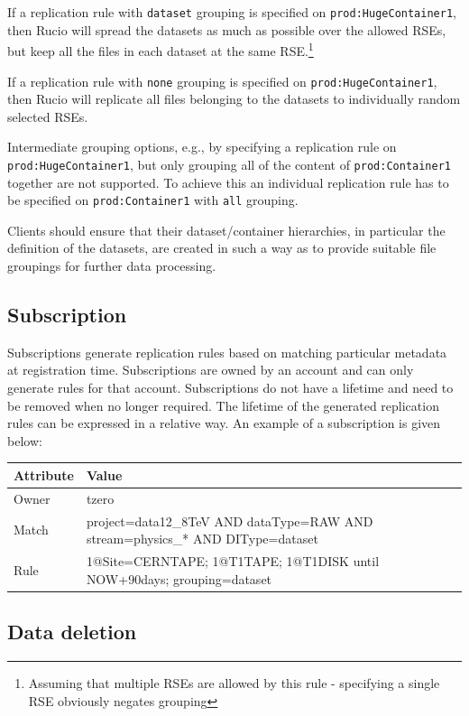 \documentclass{atlasnote}
\begin{document}
If a replication rule with \texttt{dataset} grouping is specified on \texttt{prod:HugeContainer1}, then Rucio will spread the datasets as much as possible over the allowed RSEs, but keep all the files in each dataset at the same RSE.\footnote{Assuming that multiple RSEs are allowed by this rule - specifying a single RSE obviously negates grouping}

If a replication rule with \texttt{none} grouping is specified on \texttt{prod:HugeContainer1}, then Rucio will replicate all files belonging to the datasets to individually random selected RSEs.

Intermediate grouping options, e.g., by specifying a replication rule on \texttt{prod:HugeContainer1}, but only grouping all of the content of \texttt{prod:Container1} together are not supported. To achieve this an individual replication rule has to be specified on \texttt{prod:Container1} with \texttt{all} grouping.

Clients should ensure that their dataset/container hierarchies, in particular the definition of the datasets, are created in such a way as to provide suitable file groupings for further data processing.

\subsection{Subscription}
\label{sec:Subscription}

Subscriptions generate replication rules based on matching particular metadata at registration time. Subscriptions are owned by an account and can only generate rules for that account. Subscriptions do not have a lifetime and need to be removed when no longer required. The lifetime of the generated replication rules can be expressed in a relative way. An example of a subscription is given below:

\bigskip

\begin{tabular}{l p{11cm}}
\toprule
\textbf{Attribute} & \textbf{Value} \\
\midrule
Owner & tzero \\
Match & project=data12\_8TeV AND dataType=RAW AND stream=physics\_* AND DIType=dataset \\
Rule & 1@Site=CERNTAPE; 1@T1TAPE; 1@T1DISK until NOW+90days; grouping=dataset \\
\bottomrule
\end{tabular}

\subsection{Data deletion}
\label{sec:Datadeletion}
\end{document}
